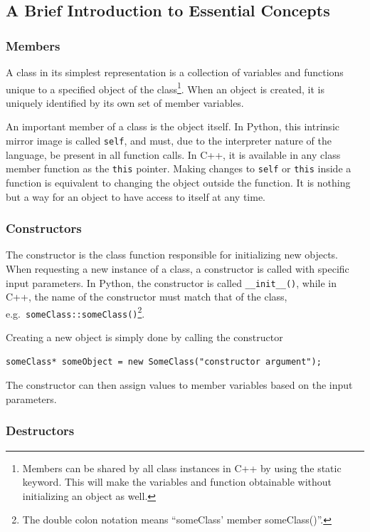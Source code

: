 \subsection{A Brief Introduction to Essential Concepts}

\subsubsection{Members}

A class in its simplest representation is a collection of variables and functions unique to a specified object of the class\footnote{Members can be shared by all class instances in C++ by using the static keyword. This will make the variables and function obtainable without initializing an object as well.}. When an object is created, it is uniquely identified by its own set of member variables.

An important member of a class is the object itself. In Python, this intrinsic mirror image is called \verb+self+, and must, due to the interpreter nature of the language, be present in all function calls. In C++, it is available in any class member function as the \verb+this+ pointer. Making changes to \verb+self+ or \verb+this+ inside a function is equivalent to changing the object outside the function. It is nothing but a way for an object to have access to itself at any time.

\subsubsection{Constructors}

The constructor is the class function responsible for initializing new objects. When requesting a new instance of a class, a constructor is called with specific input parameters. In Python, the constructor is called \verb+__init__()+, while in C++, the name of the constructor must match that of the class, e.g.~\verb+someClass::someClass()+\footnote{The double colon notation means ``someClass' member someClass()''.}.

Creating a new object is simply done by calling the constructor

\begin{lstlisting}
someClass* someObject = new SomeClass("constructor argument");
\end{lstlisting}

The constructor can then assign values to member variables based on the input parameters.

\subsubsection{Destructors}


